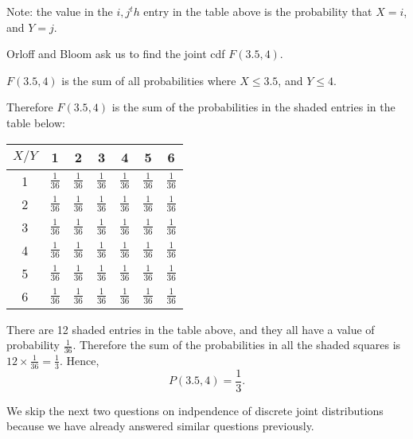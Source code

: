 \documentclass[a4paper,11pt]{article}
\begin{document}
Note: the value in the $i,j^th$ entry in the table above is the probability that
$X=i$, and $Y=j$.

Orloff and Bloom ask us to find the joint cdf $F \left(3.5, 4 \right)$.

$F\left(3.5, 4 \right)$ is the sum of all probabilities where $X \leq 3.5$, and
$Y \leq 4$.

Therefore $F \left( 3.5, 4 \right)$ is the sum of the probabilities in the
shaded entries in the table below:


\begin{center}
  \begin{tabular}{ | c | c | c | c | c | c | c |}
    \hline
    $X/Y$ & 1  & 2  & 3  & 4  & 5  &  6    \\ \hline
    1     & \cellcolor{blue!25} $\frac{1}{36}$  & \cellcolor{blue!25} $\frac{1}{36}$ & \cellcolor{blue!25} $\frac{1}{36}$ & \cellcolor{blue!25} $\frac{1}{36}$ & $\frac{1}{36}$ & $\frac{1}{36}$   \\ \hline
    2     & \cellcolor{blue!25} $\frac{1}{36}$  & \cellcolor{blue!25} $\frac{1}{36}$ & \cellcolor{blue!25} $\frac{1}{36}$ & \cellcolor{blue!25} $\frac{1}{36}$ & $\frac{1}{36}$ & $\frac{1}{36}$   \\ \hline
    3     & \cellcolor{blue!25} $\frac{1}{36}$  & \cellcolor{blue!25} $\frac{1}{36}$ & \cellcolor{blue!25} $\frac{1}{36}$ & \cellcolor{blue!25} $\frac{1}{36}$ & $\frac{1}{36}$ & $\frac{1}{36}$   \\ \hline
    4     &  $\frac{1}{36}$  & $\frac{1}{36}$ & $\frac{1}{36}$ & $\frac{1}{36}$ & $\frac{1}{36}$ & $\frac{1}{36}$   \\ \hline
    5     &  $\frac{1}{36}$  & $\frac{1}{36}$ & $\frac{1}{36}$ & $\frac{1}{36}$ & $\frac{1}{36}$ & $\frac{1}{36}$   \\ \hline
    6     &  $\frac{1}{36}$  & $\frac{1}{36}$ & $\frac{1}{36}$ & $\frac{1}{36}$ & $\frac{1}{36}$ & $\frac{1}{36}$   \\ \hline
  \end{tabular}
\end{center}

There are 12 shaded entries in the table above, and they all have a value of
probability $\frac{1}{36}$.  Therefore the sum of the probabilities in all
the shaded squares is $ 12 \times \frac{1}{36} = \frac{1}{3}$.  Hence,
\begin{equation}
  P \left( 3.5, 4 \right) = \frac{1}{3}.
\end{equation}

We skip the next two questions on indpendence of discrete joint distributions because
we have already answered similar questions previously.
\end{document}

